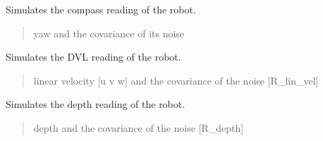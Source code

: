 \documentclass[letterpaper,10pt,english]{sphinxmanual}
\begin{document}
\begin{fulllineitems}
\begin{fulllineitems}
\begin{quote}
\begin{description}
\end{description}\end{quote}

\end{fulllineitems}


\begin{fulllineitems}
\label{\detokenize{robot_simulation:AUV4DOFSimulatedRobot.AUV4DOFSimulatedRobot.ReadCompass}}
\pysigstartsignatures
{}
\pysigstopsignatures
\sphinxAtStartPar
Simulates the compass reading of the robot.
\begin{quote}\begin{description}
\sphinxAtStartPar
yaw and the covariance of its noise 

\end{description}\end{quote}

\end{fulllineitems}


\begin{fulllineitems}
\label{\detokenize{robot_simulation:AUV4DOFSimulatedRobot.AUV4DOFSimulatedRobot.ReadDVL}}
\pysigstartsignatures
{}
\pysigstopsignatures
\sphinxAtStartPar
Simulates the DVL reading of the robot.
\begin{quote}\begin{description}
\sphinxAtStartPar
linear velocity {[}u v w{]} and the covariance of the noise {[}R\_lin\_vel{]}

\end{description}\end{quote}

\end{fulllineitems}


\begin{fulllineitems}
\label{\detokenize{robot_simulation:AUV4DOFSimulatedRobot.AUV4DOFSimulatedRobot.ReadDepth}}
\pysigstartsignatures
{}
\pysigstopsignatures
\sphinxAtStartPar
Simulates the depth reading of the robot.
\begin{quote}\begin{description}
\sphinxAtStartPar
depth and the covariance of the noise {[}R\_depth{]}


\end{description}
\end{quote}
\end{fulllineitems}
\end{fulllineitems}
\end{document}
